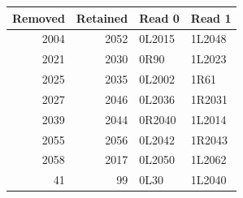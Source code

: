 \begin{center}
\begin{tabular}{@{}rrll@{}}
\toprule
Removed & Retained & Read 0 & Read 1\\
\midrule
2004 & 2052 & 0L2015 & 1L2048\\
2021 & 2030 & 0R90 & 1L2023\\
2025 & 2035 & 0L2002 & 1R61\\
2027 & 2046 & 0L2036 & 1R2031\\
2039 & 2044 & 0R2040 & 1L2014\\
2055 & 2056 & 0L2042 & 1R2043\\
2058 & 2017 & 0L2050 & 1L2062\\
41 & 99 & 0L30 & 1L2040\\
\bottomrule
\end{tabular}
\end{center}
